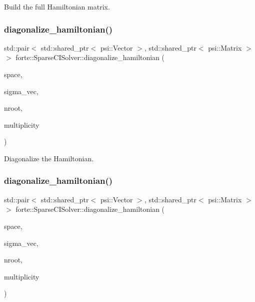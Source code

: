 Build the full Hamiltonian matrix. 

\mbox{\label{classforte_1_1_sparse_c_i_solver_aa81ea670ca5f9c488283df101c0a9e15}} 
\subsubsection{\texorpdfstring{diagonalize\+\_\+hamiltonian()}{diagonalize\_hamiltonian()}\hspace{0.1cm}{\footnotesize\ttfamily [1/2]}}
{\footnotesize\ttfamily std\+::pair$<$ std\+::shared\+\_\+ptr$<$ psi\+::\+Vector $>$, std\+::shared\+\_\+ptr$<$ psi\+::\+Matrix $>$ $>$ forte\+::\+Sparse\+C\+I\+Solver\+::diagonalize\+\_\+hamiltonian (\begin{DoxyParamCaption}\item[{const \mbox{\hyperlink{classforte_1_1_determinant_hash_vec}{Determinant\+Hash\+Vec}} \&}]{space,  }\item[{std\+::shared\+\_\+ptr$<$ \mbox{\hyperlink{classforte_1_1_sigma_vector}{Sigma\+Vector}} $>$}]{sigma\+\_\+vec,  }\item[{int}]{nroot,  }\item[{int}]{multiplicity }\end{DoxyParamCaption})}



Diagonalize the Hamiltonian. 

\mbox{\label{classforte_1_1_sparse_c_i_solver_a6de972e8f7fafb70951db94bf5cd89bc}} 
\subsubsection{\texorpdfstring{diagonalize\+\_\+hamiltonian()}{diagonalize\_hamiltonian()}\hspace{0.1cm}{\footnotesize\ttfamily [2/2]}}
{\footnotesize\ttfamily std\+::pair$<$ std\+::shared\+\_\+ptr$<$ psi\+::\+Vector $>$, std\+::shared\+\_\+ptr$<$ psi\+::\+Matrix $>$ $>$ forte\+::\+Sparse\+C\+I\+Solver\+::diagonalize\+\_\+hamiltonian (\begin{DoxyParamCaption}\item[{const std\+::vector$<$ \mbox{\hyperlink{namespaceforte_a2076c63fd7b8732004d9e1442ce527c1}{Determinant}} $>$ \&}]{space,  }\item[{std\+::shared\+\_\+ptr$<$ \mbox{\hyperlink{classforte_1_1_sigma_vector}{Sigma\+Vector}} $>$}]{sigma\+\_\+vec,  }\item[{int}]{nroot,  }\item[{int}]{multiplicity }\end{DoxyParamCaption})}

